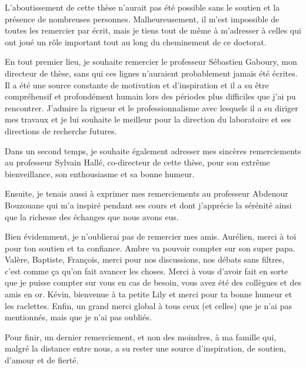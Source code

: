 \begin{ack}

L'aboutissement de cette thèse  n'aurait pas été possible sans le soutien et la présence de nombreuses personnes. Malheureusement, il m'est impossible de toutes les remercier par écrit, mais je tiens tout de même à m'adresser à celles qui ont joué un rôle important tout au long du cheminement de ce doctorat.

En tout premier lieu, je souhaite remercier le professeur Sébastien Gaboury, mon directeur de thèse, sans qui ces lignes n'auraient probablement jamais été écrites. Il a été une source constante de motivation et d’inspiration et il a su être compréhensif et profondément humain lors des périodes plus difficiles que j'ai pu rencontrer. J'admire la rigueur et le professionnalisme avec lesquels il a su diriger mes travaux et je lui souhaite le meilleur pour la direction du laboratoire et ses directions de recherche futures.

Dans un second temps, je souhaite également adresser mes sincères remerciements au professeur Sylvain Hallé, co-directeur de cette thèse, pour son extrême bienveillance, son enthousiasme et sa bonne humeur.

Ensuite, je tenais aussi à exprimer mes remerciements au professeur Abdenour Bouzouane qui m'a inspiré pendant ses cours et dont j'apprécie la sérénité ainsi que la richesse des échanges que nous avons eus.

Bien évidemment, je n'oublierai pas de remercier mes amis. Aurélien, merci à toi pour ton soutien et ta confiance. Ambre va pouvoir compter sur son super papa. Valère, Baptiste, François, merci pour nos discussions, nos débats sans filtres, c'est comme ça qu'on fait avancer les choses. Merci à vous d'avoir fait en sorte que je puisse compter sur vous en cas de besoin, vous avez été des collègues et des amis en or. Kévin, bienvenue à ta petite Lily et merci pour ta bonne humeur et les raclettes. Enfin, un grand merci global à tous ceux (et celles) que je n'ai pas mentionnés, mais que je n'ai pas oubliés.

Pour finir, un dernier remerciement, et non des moindres, à ma famille qui, malgré la distance entre nous, a su rester une source d’inspiration, de soutien, d’amour et de fierté.

\end{ack}
